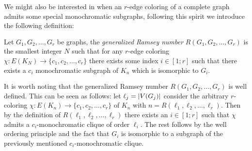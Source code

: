 We might also be interested in when an $r$-edge coloring of a complete graph admits some special monochromatic subgraphs, following this spirit we introduce the following definition:
\begin{definition}
	Let $G_1, G_2, \ldots, G_r$ be graphs, the \textit{generalized Ramsey number} $R(G_1, G_2, \ldots, G_{r})$ is the smallest integer $N$ such that for any $r$-edge coloring $\chi: E(K_N) \to \{c_1, c_2, \ldots, c_{r}\}$ there exists some index $i \in [1; r]$ such that there exists a $c_i$ monochromatic subgraph of $K_n$ which is isomorphic to $G_{i}$.
\end{definition}

It is worth noting that the generalized Ramsey number $R(G_1, G_2, \ldots, G_{r})$ is well defined. This can be seen as follows: let $\ell_j = \left\lvert V(G_{j})\right\rvert$ consider the arbitrary $r$-coloring $\chi: E(K_n) \to \{c_1, c_2, \ldots, c_{r}\}$ of $K_n$ with $n = R(\ell_1, \ell_2, \ldots, \ell_{r})$. Then by the definition of $R(\ell_1, \ell_2, \ldots, \ell_{r})$ there exists an $i \in [1; r]$ such that $\chi$ admits a $c_i$-monochromatic clique of order $\ell_i$. The rest follows by the well ordering principle and the fact that $G_i$ is isomorphic to a subgraph of the previously mentioned $c_{i}$-monochromatic clique.
